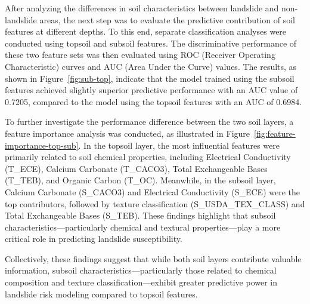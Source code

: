 After analyzing the differences in soil characteristics between landslide and non-landslide areas, the next step was to evaluate the predictive contribution of soil features at different depths. To this end, separate classification analyses were conducted using topsoil and subsoil features. The discriminative performance of these two feature sets was then evaluated using ROC (Receiver Operating Characteristic) curves and AUC (Area Under the Curve) values. The results, as shown in Figure~\ref{fig:sub-top}, indicate that the model trained using the subsoil features achieved slightly superior predictive performance with an AUC value of 0.7205, compared to the model using the topsoil features with an AUC of 0.6984.

To further investigate the performance difference between the two soil layers, a feature importance analysis was conducted, as illustrated in Figure~\ref{fig:feature-importance-top-sub}. In the topsoil layer, the most influential features were primarily related to soil chemical properties, including Electrical Conductivity (T\_ECE), Calcium Carbonate (T\_CACO3), Total Exchangeable Bases (T\_TEB), and Organic Carbon (T\_OC). Meanwhile, in the subsoil layer, Calcium Carbonate (S\_CACO3) and Electrical Conductivity (S\_ECE) were the top contributors, followed by texture classification (S\_USDA\_TEX\_CLASS) and Total Exchangeable Bases (S\_TEB). These findings highlight that subsoil characteristics—particularly chemical and textural properties—play a more critical role in predicting landslide susceptibility.

Collectively, these findings suggest that while both soil layers contribute valuable information, subsoil characteristics—particularly those related to chemical composition and texture classification—exhibit greater predictive power in landslide risk modeling compared to topsoil features.

